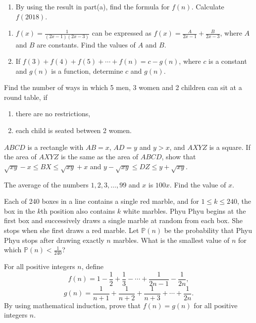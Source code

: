 \begin{problems}
\begin{enumerate}
        \item By using the result in part(a), find the formula for $f(n)$.
            Calculate $f(2018)$. 
    \end{enumerate}
    
    \problem \begin{enumerate}
        \item $f(x) = \frac{1}{(2x - 1)(2x - 3)}$ can be expressed as $f(x) =
            \frac{A}{2x - 1}+\frac{B}{2x - 3}$, where $A$ and $B$ are
            constants. Find the values of $A$ and $B$. 
        
        \item If $f(3) + f(4) + f(5) + \cdots + f(n) = c - g(n)$, where $c$ is
            a constant and $g(n)$ is a function, determine $c$ and $g(n)$. 
    \end{enumerate}
    
    \problem Find the number of ways in which 5 men, 3 women and 2 children can
    sit at a round table, if 
    \begin{enumerate}
        \item there are no restrictions,
        
        \item each child is seated between 2 women.
    \end{enumerate}
    
    \problem $ABCD$ is a rectangle with $AB = x$, $AD = y$ and $y > x$, and
    $AXYZ$ is a square. If the area of $AXYZ$ is the same as the area of
    $ABCD$, show that $\sqrt{xy} - x\leq BX\leq \sqrt{xy} + x$ and $y -
    \sqrt{xy} \leq DZ\leq y + \sqrt{xy}$. 
    
    \problem The average of the numbers $1, 2, 3, \ldots, 99$ and $x$ is
    $100x$. Find the value of $x$. 
    
    \problem Each of 240 boxes in a line contains a single red marble, and for
    $1 \leq k \leq 240$, the box in the $k$th position also contains $k$ white
    marbles. Phyu Phyu begins at the first box and successively draws a single
    marble at random from each box. She stops when she first draws a red
    marble. Let $\mathbb{P}(n)$ be the probability that Phyu Phyu stops after
    drawing exactly $n$ marbles. What is the smallest value of $n$ for which
    $\mathbb{P}(n) < \frac{1}{240}$?
    
    \problem For all positive integers $n$, define 
    \[f(n) = 1 - \frac{1}{2} + \frac{1}{3} - \cdots + \frac{1}{2n-1} -
    \frac{1}{2n},\]
    \[g(n) = \frac{1}{n + 1} + \frac{1}{n + 2} + \frac{1}{n + 3} + \cdots +
    \frac{1}{2n}.\]
    By using mathematical induction, prove that $f(n) = g(n)$ for all positive
    integers $n$. 
    

\end{problems}
